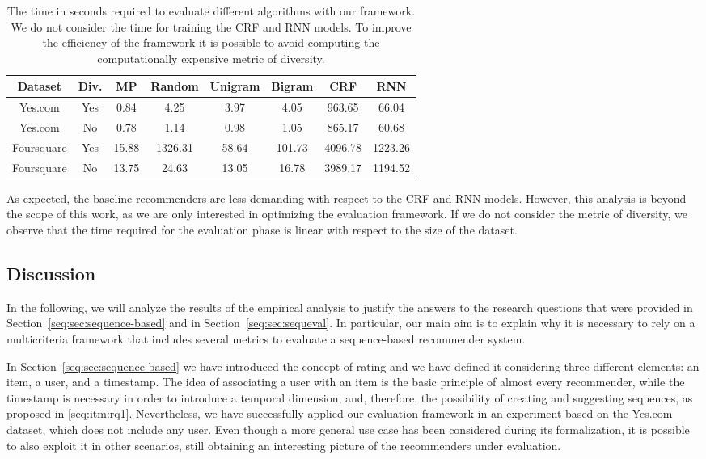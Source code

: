 \begin{table}
\centering
\begin{tabular}{@{}cccccccc@{}}
\toprule
Dataset & Div. & MP & Random & Unigram & Bigram & CRF & RNN \\ \midrule
Yes.com & Yes & 0.84 & 4.25 & 3.97 & 4.05 & 963.65 & 66.04 \\
Yes.com & No & 0.78 & 1.14 & 0.98 & 1.05 & 865.17 & 60.68 \\
Foursquare & Yes & 15.88 & 1326.31 & 58.64 & 101.73 & 4096.78 & 1223.26 \\
Foursquare & No & 13.75 & 24.63 & 13.05 & 16.78 & 3989.17 & 1194.52 \\ \bottomrule
\end{tabular}
\caption[Time to evaluate the algorithms]{The time in seconds required to evaluate different algorithms with our framework. We do not consider the time for training the CRF and RNN models. To improve the efficiency of the framework it is possible to avoid computing the computationally expensive metric of diversity.}
\label{seq:tab:results-efficiency}
\end{table}

As expected, the baseline recommenders are less demanding with respect to the CRF and RNN models. However, this analysis is beyond the scope of this work, as we are only interested in optimizing the evaluation framework. If we do not consider the metric of diversity, we observe that the time required for the evaluation phase is linear with respect to the size of the dataset.

\subsection{Discussion}

In the following, we will analyze the results of the empirical analysis to justify the answers to the research questions that were provided in Section~\ref{seq:sec:sequence-based} and in Section~\ref{seq:sec:sequeval}. In particular, our main aim is to explain why it is necessary to rely on a multicriteria framework that includes several metrics to evaluate a sequence-based recommender system.

In Section~\ref{seq:sec:sequence-based} we have introduced the concept of rating and we have defined it considering three different elements: an item, a user, and a timestamp. The idea of associating a user with an item is the basic principle of almost every recommender, while the timestamp is necessary in order to introduce a temporal dimension, and, therefore, the possibility of creating and suggesting sequences, as proposed in \ref{seq:itm:rq1}. Nevertheless, we have successfully applied our evaluation framework in an experiment based on the Yes.com dataset, which does not include any user. Even though a {more} general use case has been considered during its formalization, it is possible to also exploit it in other scenarios, still obtaining an interesting picture of the recommenders under evaluation.

